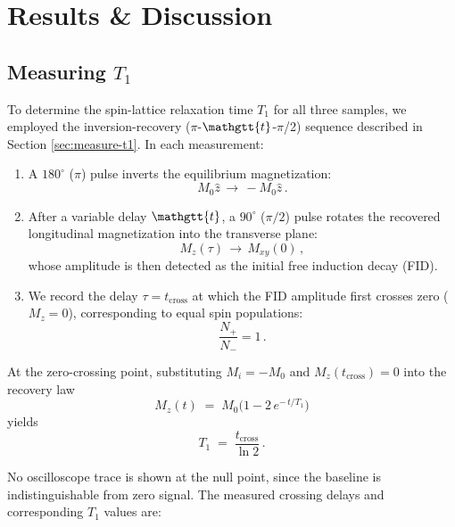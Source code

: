 \documentclass[
    floatfix,  %
    reprint,
    amsmath,
    amssymb,
    aps,
]{revtex4-2}
\newcommand{\taucode}{\mathgtt{t}}
\begin{document}
\section{Results \& Discussion}




\subsection{Measuring $T_1$}

To determine the spin-lattice relaxation time $T_1$ for all three samples, we employed the inversion-recovery ($\pi$-$\taucode$-$\pi$/2) sequence described in Section \ref{sec:measure-t1}. In each measurement:

\begin{enumerate}
    \item A $180^\circ$ ($\pi$) pulse inverts the equilibrium magnetization:
        \begin{equation}
            M_0\hat{z}\,\longrightarrow\,-M_0\hat{z}\,.
        \end{equation}
    \item After a variable delay $\taucode$, a $90^\circ$ ($\pi/2$) pulse rotates the recovered longitudinal magnetization into the transverse plane:
        \begin{equation}
            M_z(\tau)\,\longrightarrow\,M_{xy}(0)\,,
        \end{equation}
        whose amplitude is then detected as the initial free induction decay (FID).
    \item We record the delay $\tau = t_{\mathrm{cross}}$ at which the FID amplitude first crosses zero ($M_z=0$), corresponding to equal spin populations:
        \begin{equation}
            \frac{N_{+}}{N_{-}} = 1\,.
        \end{equation}
\end{enumerate}


At the zero-crossing point, substituting $M_i=-M_0$ and $M_z(t_{\mathrm{cross}})=0$ into the recovery law
\begin{equation}
    M_z(t) \;=\; M_0\bigl(1 - 2\,e^{-\,t/T_1}\bigr)
\end{equation}
yields
\begin{equation}
    T_1 \;=\;\frac{t_{\mathrm{cross}}}{\ln 2}\,.
\end{equation}

No oscilloscope trace is shown at the null point, since the baseline is indistinguishable from zero signal. The measured crossing delays and corresponding $T_1$ values are:
\end{document}

